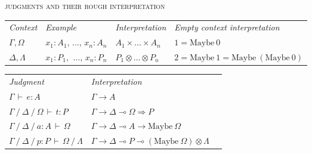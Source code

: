 \documentclass{article}
\newcommand\ensuretext[1]{{\ifmmode\text{#1}\else{#1}\fi}}
\newcommand\G\Gamma
\newcommand\D\Delta
\renewcommand\O\Omega
\renewcommand\L\Lambda
\newcommand\lto\multimap        %
\newcommand\fto{\Rightarrow}
\newcommand\ox\otimes
\newcommand\tmaybe[1]{\ensuremath{{#1}_{*}}}
\renewcommand\tmaybe[1]{\ensuremath{\text{Maybe}~{#1}}}
\newcommand\hyp[2]{{#1} \of {#2}}
\newcommand\of{\mathbin{:}}
\newcommand\cxsep{\mathbin{/}}
\newcommand\cJ[3]{{#3} \,\vdash\, {#1} : {#2}}
\newcommand\J[5]{{#3} \cxsep {#4} \cxsep {#5} \,\vdash\, {#1} : {#2}}
\newcommand\pJ[5]{{#3} \cxsep {#4} \cxsep {#1} : {#2} \,\vdash\, {#5}}
\newcommand\ppJ[6]{{#3} \cxsep {#4} \cxsep {#1} : {#2} \,\vdash\, {#5} \cxsep {#6}}
\newcommand\<\;                 %
\newcommand\todocolor{\color{red}}
\newcommand\todo[1]{\ensuretext{\todocolor #1}}
\begin{document}

\noindent\textsc{judgments and their rough interpretation}

\begin{tabular}{l@{\hskip 2em}l@{\hskip 2em}l@{\hskip 2em}l}
  \em Context & \em Example & \em Interpretation & \em Empty context interpretation\\
  $\G,\O$
  & $\hyp{x_1}{A_1},\, \dots,\, \hyp{x_n}{A_n}$
  & $A_1 \times \dots \times A_n$
  & $1 = \tmaybe{0}$
  \\
  $\D,\L$
  & $\hyp{x_1}{P_1},\ \, \dots,\, \hyp{x_n}{P_n}$
  & $P_1 \ox \dots \ox P_n$
  & $2 = \tmaybe{1} = \tmaybe{(\tmaybe{0})}$
\end{tabular}

\begin{tabular}{l@{\hskip 2em}l@{\hskip 2em}l}
  \em Judgment & \em Interpretation
  \\
  $\cJ e A \G$ & $\G \to A$
  \\
  $\J t P \G \D \O$ & $\G \to \D \lto \O \fto P$
  \\
  $\pJ a A \G \D \O$
  & $\G \to \D \lto A \to \tmaybe{\O}$
  \\
  $\ppJ p P \G \D \O \L$
  & $\G \to \D \lto P \lto (\tmaybe{\O}) \ox \L$
\end{tabular}

\end{document}
